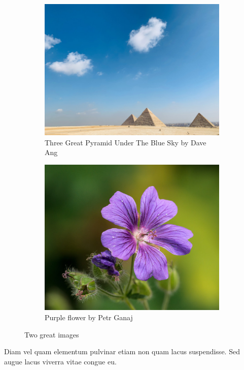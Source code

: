 \documentclass[12pt]{article}
\begin{document}
\begin{figure}[ht]
    \centering
    \begin{subfigure}{0.4\textwidth}
        \centering
        \includegraphics[width=\textwidth]{img/dave-ang-pyramid.jpg}
        \caption{Three Great Pyramid Under The Blue Sky by Dave Ang}
        \label{fig:great_pyramid}
    \end{subfigure}
    \hfill
    \begin{subfigure}{0.4\textwidth}
        \centering
        \includegraphics[width=\textwidth]{img/ganajp-purple-flower.jpg}
        \caption{Purple flower by Petr Ganaj}
        \label{fig:purple_flower}
    \end{subfigure}
    \caption{Two great images}
    \label{fig:two_great_images}
\end{figure}


Diam vel quam elementum pulvinar etiam non quam lacus suspendisse.
Sed augue lacus viverra vitae congue eu.
\end{document}
